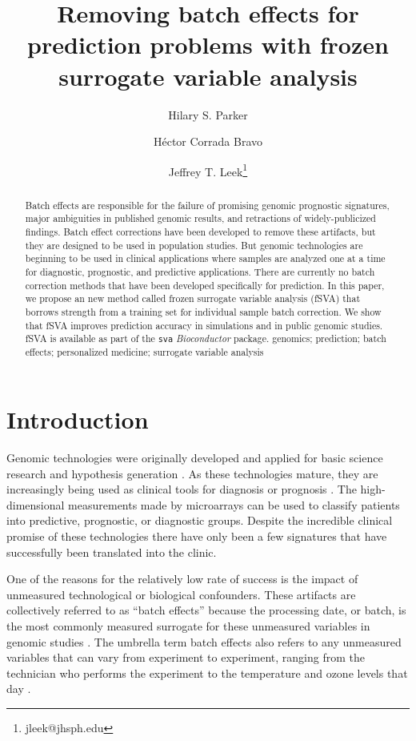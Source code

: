 \documentclass[letterpaper,12pt]{article}\usepackage[]{graphicx}\usepackage[]{color}
\title{Removing batch effects for prediction problems with frozen surrogate variable analysis}
\author[1]{Hilary S. Parker}
\author[2]{H\'{e}ctor Corrada Bravo}
\author[1]{Jeffrey T. Leek\thanks{jleek@jhsph.edu}}
\affil[1]{Department of Biostatistics, Johns Hopkins Bloomberg School of Public Health, Baltimore, MD, 21205}
\affil[2]{Center for Bioinformatics and Computational Biology, Department of Computer Science, University of Maryland, College Park, Maryland, 20742}
\begin{document}
\maketitle


\begin{abstract}
{Batch effects are responsible for the failure of promising genomic prognostic signatures, major ambiguities in published genomic results, and retractions of widely-publicized findings. Batch effect corrections have been developed to remove these artifacts, but they are designed to be used in population studies. But genomic technologies are beginning to be used in clinical applications where samples are analyzed one at a time for diagnostic, prognostic, and predictive applications. There are currently no batch correction methods that have been developed specifically for prediction. In this paper, we propose an new method called frozen surrogate variable analysis (fSVA) that borrows strength from a training set for individual sample batch correction. We show that fSVA improves prediction accuracy in simulations and in public genomic studies.  fSVA is available as part of the \texttt{sva} {\it Bioconductor} package.}
{genomics; prediction; batch effects; personalized medicine; surrogate variable analysis}
\end{abstract}


\doublespacing




\section{Introduction}
Genomic technologies were originally developed and applied for basic science research and hypothesis generation \citep{Eisen1998}. As these technologies mature, they are increasingly being used as clinical tools for diagnosis or prognosis \citep{Chan2011}. The high-dimensional measurements made by microarrays can be used to classify patients into predictive, prognostic, or diagnostic groups. Despite the incredible clinical promise of these technologies there have only been a few signatures that have successfully been translated into the clinic.

One of the reasons for the relatively low rate of success is the impact of unmeasured technological or biological confounders. These artifacts are collectively referred to as ``batch effects'' because the processing date, or batch, is the most commonly measured surrogate for these unmeasured variables in genomic studies \citep{Scharpf2011,Johnson2007b,Walker2008}. The umbrella term batch effects also refers to any unmeasured variables that can vary from experiment to experiment, ranging from the technician who performs the experiment to the temperature and ozone levels that day \citep{Lander1999,Fare2003}. 
\end{document}
